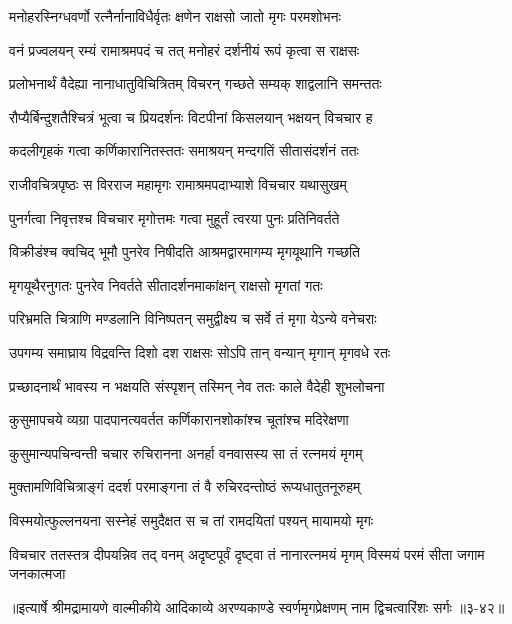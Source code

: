 \twolineshloka
{मनोहरस्निग्धवर्णो रत्नैर्नानाविधैर्वृतः}
{क्षणेन राक्षसो जातो मृगः परमशोभनः} %

\twolineshloka
{वनं प्रज्वलयन् रम्यं रामाश्रमपदं च तत्}
{मनोहरं दर्शनीयं रूपं कृत्वा स राक्षसः} %

\twolineshloka
{प्रलोभनार्थं वैदेह्या नानाधातुविचित्रितम्}
{विचरन् गच्छते सम्यक् शाद्वलानि समन्ततः} %

\twolineshloka
{रौप्यैर्बिन्दुशतैश्चित्रं भूत्वा च प्रियदर्शनः}
{विटपीनां किसलयान् भक्षयन् विचचार ह} %

\twolineshloka
{कदलीगृहकं गत्वा कर्णिकारानितस्ततः}
{समाश्रयन् मन्दगतिं सीतासंदर्शनं ततः} %

\twolineshloka
{राजीवचित्रपृष्ठः स विरराज महामृगः}
{रामाश्रमपदाभ्याशे विचचार यथासुखम्} %

\twolineshloka
{पुनर्गत्वा निवृत्तश्च विचचार मृगोत्तमः}
{गत्वा मुहूर्तं त्वरया पुनः प्रतिनिवर्तते} %

\twolineshloka
{विक्रीडंश्च क्वचिद् भूमौ पुनरेव निषीदति}
{आश्रमद्वारमागम्य मृगयूथानि गच्छति} %

\twolineshloka
{मृगयूथैरनुगतः पुनरेव निवर्तते}
{सीतादर्शनमाकांक्षन् राक्षसो मृगतां गतः} %

\twolineshloka
{परिभ्रमति चित्राणि मण्डलानि विनिष्पतन्}
{समुद्वीक्ष्य च सर्वे तं मृगा येऽन्ये वनेचराः} %

\twolineshloka
{उपगम्य समाघ्राय विद्रवन्ति दिशो दश}
{राक्षसः सोऽपि तान् वन्यान् मृगान् मृगवधे रतः} %

\twolineshloka
{प्रच्छादनार्थं भावस्य न भक्षयति संस्पृशन्}
{तस्मिन् नेव ततः काले वैदेही शुभलोचना} %

\twolineshloka
{कुसुमापचये व्यग्रा पादपानत्यवर्तत}
{कर्णिकारानशोकांश्च चूतांश्च मदिरेक्षणा} %

\twolineshloka
{कुसुमान्यपचिन्वन्ती चचार रुचिरानना}
{अनर्हा वनवासस्य सा तं रत्नमयं मृगम्} %

\twolineshloka
{मुक्तामणिविचित्राङ्गं ददर्श परमाङ्गना}
{तं वै रुचिरदन्तोष्ठं रूप्यधातुतनूरुहम्} %

\twolineshloka
{विस्मयोत्फुल्लनयना सस्नेहं समुदैक्षत}
{स च तां रामदयितां पश्यन् मायामयो मृगः} %

\threelineshloka
{विचचार ततस्तत्र दीपयन्निव तद् वनम्}
{अदृष्टपूर्वं दृष्ट्वा तं नानारत्नमयं मृगम्}
{विस्मयं परमं सीता जगाम जनकात्मजा} %


॥इत्यार्षे श्रीमद्रामायणे वाल्मीकीये आदिकाव्ये अरण्यकाण्डे स्वर्णमृगप्रेक्षणम् नाम द्विचत्वारिंशः सर्गः ॥३-४२॥

